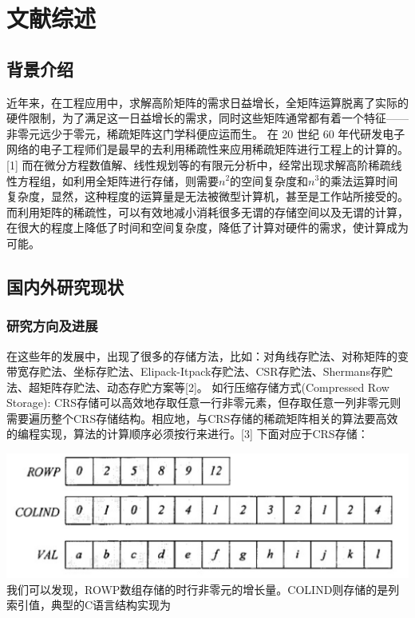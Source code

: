 \documentclass{article}
\begin{document}
\section{文献综述}
\subsection{背景介绍}

      近年来，在工程应用中，求解高阶矩阵的需求日益增长，全矩阵运算脱离了实际的硬件限制，为了满足这一日益增长的需求，同时这些矩阵通常都有着一个特征——非零元远少于零元，稀疏矩阵这门学科便应运而生。
在 20 世纪 60 年代研发电子网络的电子工程师们是最早的去利用稀疏性来应用稀疏矩阵进行工程上的计算的。[1]
而在微分方程数值解、线性规划等的有限元分析中，经常出现求解高阶稀疏线性方程组，如利用全矩阵进行存储，则需要$n^2$的空间复杂度和$n^3$的乘法运算时间复杂度，显然，这种程度的运算量是无法被微型计算机，甚至是工作站所接受的。
而利用矩阵的稀疏性，可以有效地减小消耗很多无谓的存储空间以及无谓的计算，在很大的程度上降低了时间和空间复杂度，降低了计算对硬件的需求，使计算成为可能。

\subsection{国内外研究现状}
\subsubsection{研究方向及进展}

在这些年的发展中，出现了很多的存储方法，比如：对角线存贮法、对称矩阵的变带宽存贮法、坐标存贮法、Elipack-Itpack存贮法、CSR存贮法、Shermans存贮法、超矩阵存贮法、动态存贮方案等[2]。
\newline
如行压缩存储方式(Compressed Row Storage):
CRS存储可以高效地存取任意一行非零元素，但存取任意一列非零元则需要遍历整个CRS存储结构。相应地，与CRS存储的稀疏矩阵相关的算法要高效的编程实现，算法的计算顺序必须按行来进行。[3]
下面对应于CRS存储：
\newline\newline\newline\newline\newline\newline\newline

\includegraphics[scale=0.25]{crs.png}
我们可以发现，ROWP数组存储的时行非零元的增长量。COLIND则存储的是列索引值，典型的C语言结构实现为\newline
\end{document}
